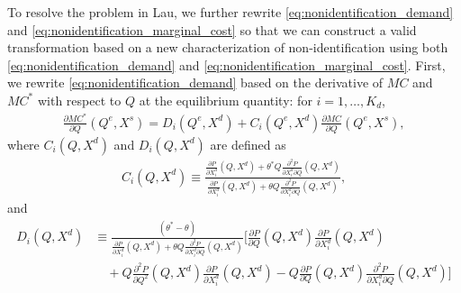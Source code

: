 \documentclass[11pt, a4paper]{article}
\theoremstyle{remark}
\begin{document}
To resolve the problem in Lau, we further rewrite \eqref{eq:nonidentification_demand} and \eqref{eq:nonidentification_marginal_cost} so that we can construct a valid transformation based on 
a new characterization of non-identification using both \eqref{eq:nonidentification_demand} and \eqref{eq:nonidentification_marginal_cost}.
First, we rewrite \eqref{eq:nonidentification_demand} based on the derivative of $MC$ and $MC^{*}$ with respect to $Q$ at the equilibrium quantity: for $i = 1, \ldots, K_d$,
\begin{align}
    \frac{\partial MC^{*}}{\partial Q}(Q^e, X^{s}) =D_i(Q^e, X^{d}) + C_i(Q^e, X^{d})\frac{\partial MC}{\partial Q}(Q^e, X^{s}),\label{eq:mc_transformation_quantity}
\end{align}
where $C_i(Q, X^{d})$ and $D_i(Q, X^{d})$ are defined as
\begin{align}
    C_i(Q, X^{d}) \equiv \frac{\frac{\partial P}{\partial X^{d}_i}(Q, X^{d}) + \theta^{*} Q\frac{\partial^2 P}{\partial X^{d}_{i}\partial Q}(Q, X^{d}) }{\frac{\partial P}{\partial X^{d}_i}(Q, X^{d}) + \theta Q\frac{\partial^2 P}{\partial X^{d}_{i}\partial Q}(Q, X^{d}) },\label{eq:ratio_marginal_revenue}
\end{align}
and
\begin{align}
    D_i(Q, X^{d}) & \equiv\frac{(\theta^{*} - \theta)}{\frac{\partial P}{\partial X^{d}_i}(Q, X^{d}) + \theta Q\frac{\partial^2 P}{\partial X^{d}_{i}\partial Q}(Q, X^{d})}\Bigg[\frac{\partial P}{\partial Q}(Q, X^{d}) \frac{\partial P}{\partial X^{d}_i}(Q, X^{d})\\
    &\quad + Q\frac{\partial^2 P}{\partial Q^2}(Q, X^{d}) \frac{\partial P}{\partial X^{d}_i}(Q, X^{d}) - Q \frac{\partial P}{\partial Q}(Q, X^{d}) \frac{\partial^2 P}{\partial X^{d}_i\partial Q}(Q, X^{d}) \Bigg]\label{eq:intercation_derivative_demand}
\end{align}
\end{document}
